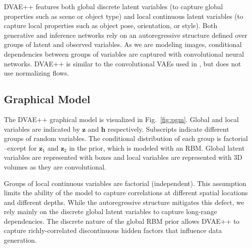 \documentclass{article}
\newcommand{\z}{{\pmb{z}}}
\newcommand{\h}{{\pmb{h}}}
\begin{document}
DVAE++ features both global discrete latent variables (to capture global properties such as scene or object type) and local continuous latent variables (to capture local properties 
such as object pose, orientation, or style). Both generative and inference networks rely on an autoregressive structure defined over groups of latent and observed variables. As we are modeling images, conditional dependencies between groups of variables are captured with convolutional neural networks. DVAE++ is similar to
the convolutional VAEs used in \cite{kingma2016improved, chen2016variational}, but does not use normalizing flows.

\subsection{Graphical Model}

The DVAE++ graphical model is visualized in Fig.~\ref{fig:pgm}. Global and local variables are indicated by $\z$ and $\h$ respectively. Subscripts indicate different groups of random variables. The conditional distribution of each group is factorial --except for $\z_1$ and $\z_2$ in the prior, which is modeled with an RBM. Global latent variables are represented with boxes and local variables are represented with 3D volumes as they are convolutional. 

Groups of local continuous variables are factorial (independent). This assumption limits the ability of the model to capture correlations at different spatial locations and different depths. While the autoregressive structure mitigates this defect, we rely mainly on the discrete global latent variables to capture long-range dependencies. The discrete nature of the global RBM prior allows DVAE++ to capture richly-correlated discontinuous hidden factors that influence data generation. 
\end{document}
